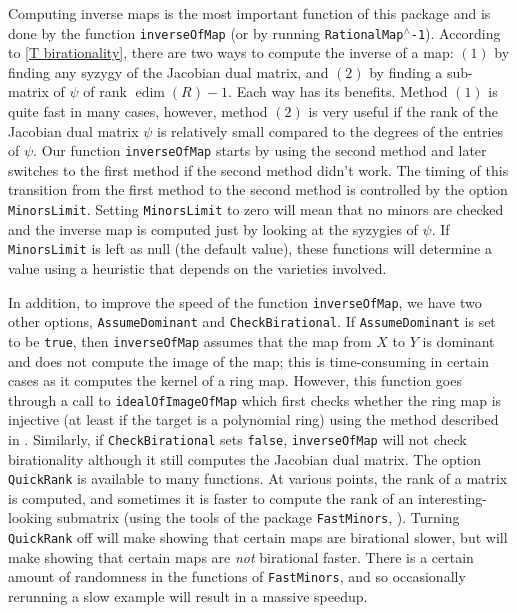 \documentclass[11pt]{amsart}%
\numberwithin{equation}{theorem}
\renewcommand{\:}{\colon}
\DeclareMathOperator{\edim}{edim}
\theoremstyle{theorem}
\begin{document}
Computing inverse maps is the most important function of this package and is done by the function {\tt inverseOfMap} (or by running {\tt RationalMap{${}^\wedge$}-1}). According to \autoref{T birationality}, there are two ways to compute the inverse of a map: $(1)$ by finding any syzygy of the Jacobian dual matrix, and $(2)$ by finding a sub-matrix of $\psi$ of rank $\edim(R)-1$. Each way has its benefits. Method $(1)$ is quite fast in many cases, however, method $(2)$ is very useful if the rank of the Jacobian dual matrix  $\psi$ is relatively small compared to the degrees of the entries of $\psi$. Our function {\tt inverseOfMap} starts by using the second method and later switches to the first method if the second method didn't work.  The timing of this transition from the first method to the second method is controlled by the option {\tt MinorsLimit}. Setting {\tt MinorsLimit} to zero will mean that no minors are checked and the inverse map is computed just by looking at the syzygies of $\psi$.  If {\tt MinorsLimit} is left as null (the default value), these functions will determine a value using a heuristic that depends on the varieties involved.

 In addition, to improve the speed of the function {\tt inverseOfMap}, we have two other options, {\tt AssumeDominant} and {\tt CheckBirational}. If {\tt AssumeDominant} is set  to be {\tt true},  then  {\tt inverseOfMap} assumes that the map from $X$ to $Y$ is dominant and does not compute the image of the map; this is time-consuming in certain cases as it computes the kernel of a ring map.  However, this function goes through a call to {\tt idealOfImageOfMap} which first checks whether the ring map is injective (at least if the target is a polynomial ring) using the method described in \cite[Proposition 1.1]{SimisTwoDifferentialThemes}.
 Similarly, if {\tt CheckBirational} sets {\tt false}, {\tt inverseOfMap} will  not check birationality although it still computes the Jacobian dual matrix.  The option {\tt QuickRank} is available to many functions.  At various points, the rank of a matrix is computed, and sometimes it is faster to compute the rank of an interesting-looking submatrix (using the tools of the package {\tt FastMinors}, \cite{FastMinorsArticle}).  Turning {\tt QuickRank} off will make showing that certain maps are birational slower, but will make showing that certain maps are \emph{not} birational faster.  There is a certain amount of randomness in the functions of {\tt FastMinors}, and so occasionally rerunning a slow example will result in a massive speedup.
\end{document}
